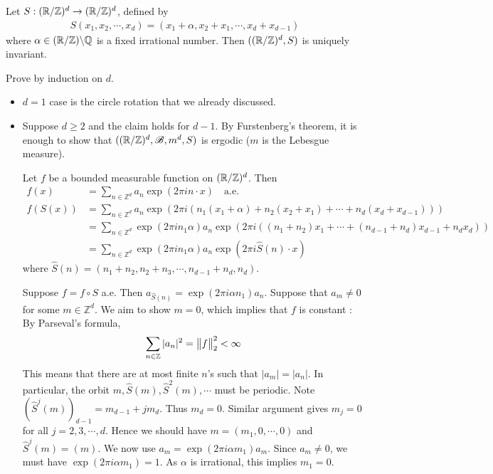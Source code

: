 \documentclass[12pt,a4paper]{report}
\newenvironment{proof}
{\begin{changemargin}{1cm}{0.5cm} 
	}%
	{\end{changemargin}
}
\begin{document}
\cor Let $S : (\mathbb{R}/ \mathbb{Z})^d \rightarrow (\mathbb{R}/ \mathbb{Z})^d$, defined by
\begin{align*}
S(x_1,x_2, \cdots, x_d)  = (x_1 +\alpha,x_2+x_1, \cdots, x_d+x_{d-1})
\end{align*}
where $\alpha \in (\mathbb{R}/ \mathbb{Z}) \backslash \mathbb{Q}$ is a fixed irrational number. Then $((\mathbb{R}/\mathbb{Z})^d,S)$ is uniquely invariant. 
\begin{proof}
\pf Prove by induction on $d$.
\begin{itemize}
\item $d=1$ case is the circle rotation that we already discussed.
\item Suppose $d\geq 2$ and the claim holds for $d-1$. By Furstenberg's theorem, it is enough to show that $((\mathbb{R}/\mathbb{Z})^d, \mathscr{B}, m^d,S)$ is ergodic ($m$ is the Lebesgue measure).

\quad Let $f$ be a bounded measurable function on $(\mathbb{R}/\mathbb{Z})^d$. Then
\begin{align*}
f(x) &= \sum_{n\in \mathbb{Z}^d} a_n \exp(2\pi i n \cdot x) \quad \text{a.e.}\\ 
f(S(x)) &= \sum_{n\in \mathbb{Z}^d}  a_n \exp(2\pi i( n_1(x_1 +\alpha) + n_2(x_2+x_1) + \cdots + n_d(x_d +x_{d-1})    )) \\
&= \sum_{n\in \mathbb{Z}^d} \exp(2\pi i n_1 \alpha) a_n \exp(2\pi i((n_1 + n_2)x_1 + \cdots +(n_{d-1}+n_d)x_{d-1} + n_d x_d  )  ) \\
&= \sum_{n\in \mathbb{Z}^d} \exp(2\pi i n_1 \alpha) a_n \exp(2\pi i \hat{S}(n) \cdot x)
\end{align*}
where $\hat{S}(n) = (n_1 + n_2, n_2 + n_3, \cdots, n_{d-1}+n_d, n_d)$.

\quad Suppose $f = f\circ S$ a.e. Then $a_{\hat{S}(n)} = \exp(2\pi i\alpha n_1) a_n$. Suppose that $a_m \neq 0$ for some $m\in \mathbb{Z}^d$. We aim to show $m=0$, which implies that $f$ is constant : By Parseval's formula,
\begin{align*}
\sum_{n\in \mathbb{Z}}|a_n|^2  = \bigl\lVert f\bigr\rVert_{2}^2 < \infty
\end{align*}
This means that there are at most finite $n$'s such that $|a_m| = |a_n|$. In particular, the orbit $m,\hat{S}(m),\hat{S}^2(m),\cdots$ must be periodic. Note $(\hat{S}^j(m))_{d-1} = m_{d-1} + jm_d$. Thus $m_d =0$. Similar argument gives $m_j=0$ for all $j=2,3,\cdots,d$. Hence we should have $m=(m_1,0,\cdots,0)$ and $\hat{S}^j(m) = (m)$. We now use $a_m = \exp(2\pi i \alpha m_1) a_m$. Since $a_m \neq 0$, we must have $\exp(2\pi i\alpha m_1) =1$. As $\alpha$ is irrational, this implies $m_1 =0$. 
\end{itemize}

\eop
\end{proof}
\s
\end{document}
